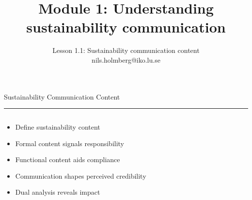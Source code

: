 \documentclass[aspectratio=169]{beamer}
\title{Module 1: Understanding sustainability communication}
\subtitle{Lesson 1.1: Sustainability communication content \\[0.8em]nils.holmberg@iko.lu.se}
\author{}
\newcommand{\TitleFont}{\rmfamily}
\begin{document}
\begin{frame}[plain]
  \titlepage
\end{frame}
\setcounter{framenumber}{0} %

\begin{frame}[t]{}
  \vspace*{0.5cm}
  {\TitleFont\fontsize{18}{22}\selectfont\color{LUBronze}Sustainability Communication Content\par}
  \vspace{0.3em}
  {\color{LUBronze}\rule{\linewidth}{0.8pt}}\par
  \vspace{0.2cm}
  \begin{columns}[t]
    \begin{column}[t]{0.45\textwidth}
      \vspace*{0pt}
      \begin{itemize}\setlength\itemsep{0.65em}
        \item Define sustainability content
        \item Formal content signals responsibility
        \item Functional content aids compliance
        \item Communication shapes perceived credibility
        \item Dual analysis reveals impact
      \end{itemize}
    \end{column}
  \end{columns}
\end{frame}
\end{document}
